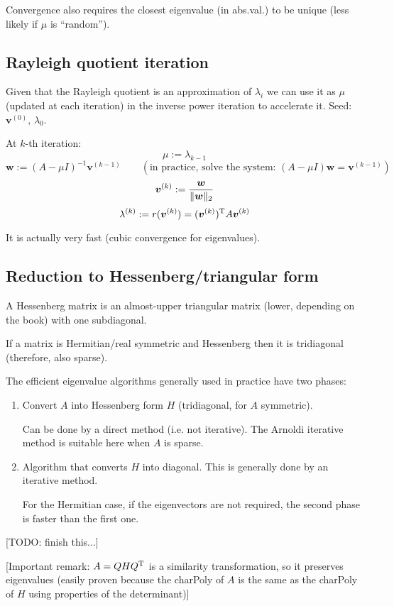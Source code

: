 \documentclass[
  12pt,
  paper=a4,
]{scrartcl} %
\begin{document}
Convergence also requires the closest eigenvalue (in abs.\@ val.) to be unique (less likely if $\mu$ is ``random'').


\subsection*{Rayleigh quotient iteration}

Given that the Rayleigh quotient is an approximation of $\lambda_i$ we can use it as $\mu$ (updated at each iteration) in the inverse power iteration to accelerate it. 
Seed: $\bm v^{(0)},\,\lambda_0$.

At $k$-th iteration:
\[
    \mu := \lambda_{k-1}
\]\[
    \bm w := (A-\mu I)^{-1} \bm v^{(k-1)} \qquad 
    (\text{in practice, solve the system: }(A-\mu I)\bm w = \bm v^{(k-1)})
\]
\[
    \bm v^{(k)} := \frac{\bm w}{\|\bm w\|_2}
\]
\[
    \lambda^{(k)} := r(\bm v^{(k)}) = (\bm v^{(k)})^{\mathrm{T}} A \bm v^{(k)}
\]

It is actually very fast (cubic convergence for eigenvalues).

\subsection*{Reduction to Hessenberg/triangular form}

A Hessenberg matrix is an almost-upper triangular matrix (lower, depending on the book) with one subdiagonal.


If a matrix is Hermitian/real symmetric and Hessenberg then it is tridiagonal (therefore, also sparse).

The efficient eigenvalue algorithms generally used in practice have two phases:
\begin{enumerate}
    \item Convert $A$ into Hessenberg form $H$ (tridiagonal, for $A$ symmetric).
    
    Can be done by a direct method (i.e. not iterative). The Arnoldi iterative method is suitable here when $A$ is sparse.
    
    \item Algorithm that converts $H$ into diagonal. This is generally done by an iterative method.
    
    For the Hermitian case, if the eigenvectors are not required, the second phase is faster than the first one.
\end{enumerate}

[TODO: finish this...]

[Important remark: $A=QHQ^{\mathrm{T}}$ is a similarity transformation, so it preserves eigenvalues (easily proven because the charPoly of $A$ is the same as the charPoly of $H$ using properties of the determinant)]
\end{document}
